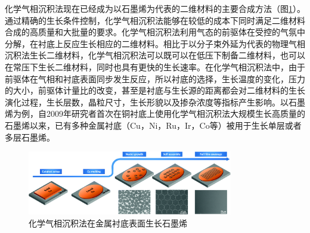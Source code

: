     化学气相沉积法现在已经成为以石墨烯为代表的二维材料的主要合成方法（图\ref{fig:intro_CVD_graphene_growth}）。通过精确的生长条件控制，化学气相沉积法能够在较低的成本下同时满足二维材料合成的高质量和大批量的要求。化学气相沉积法利用气态的前驱体在受控的气氛中分解，在衬底上反应生长相应的二维材料。相比于以分子束外延为代表的物理气相沉积法生长二维材料，化学气相沉积法可以既可以在低压下制备二维材料，也可以在常压下生长二维材料，同时也具有更快的生长速率。在化学气相沉积法中，由于前驱体在气相和衬底表面同步发生反应，所以衬底的选择，生长温度的变化，压力的大小，前驱体计量比的改变，甚至是衬底与生长源的距离都会对二维材料的生长演化过程，生长层数，晶粒尺寸，生长形貌以及掺杂浓度等指标产生影响。以石墨烯为例，自2009年研究者首次在铜衬底上使用化学气相沉积法大规模生长高质量的石墨烯以来，已有多种金属衬底（Cu，Ni，Ru，Ir，Co等）被用于生长单层或者多层石墨烯。

    \begin{figure}[htb]
        \includegraphics[width=0.8\textwidth]{pic/INTRO_CVD_graphene_growth.png}
        \caption{化学气相沉积法在金属衬底表面生长石墨烯}
        \label{fig:intro_CVD_graphene_growth}
    \end{figure}

